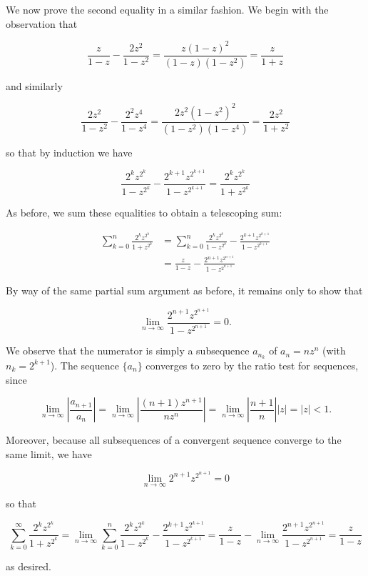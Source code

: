 \begin{solution}
    \pagebreak

    We now prove the second equality in a similar fashion. We begin with the observation that  

    $$
        \frac{z}{1 - z} - \frac{2 z^2}{1 - z^2} = \frac{z (1 - z)^2}{(1 - z)(1 - z^2)} = \frac{z}{1 + z}
    $$

    and similarly

    $$
        \frac{2 z^2}{1 - z^2} - \frac{2^2 z^4}{1 - z^4} = \frac{2z^2 (1 - z^2)^2}{(1 - z^2)(1 - z^4)} = \frac{2 z^2}{1 + z^2}
    $$

    so that by induction we have

    $$
        \frac{2^k z^{2^k}}{1 - z^{2^k}} - \frac{2^{k+1} z^{2^{k+1}}}{1 - z^{2^{k+1}}} = \frac{2^k z^{2^k}}{1 + z^{2^k}}
    $$

    As before, we sum these equalities to obtain a telescoping sum:

    \begin{align*}
        \sum\limits_{k=0}^{n} \frac{2^k z^{2^k}}{1 + z^{2^k}} &= \sum\limits_{k=0}^{n} \frac{2^k z^{2^k}}{1 - z^{2^k}} - \frac{2^{k+1} z^{2^{k+1}}}{1 - z^{2^{k+1}}} \\
                                                              &= \frac{z}{1 - z} - \frac{2^{n+1} z^{2^{n+1}}}{1 - z^{2^{n+1}}}
    \end{align*}

    By way of the same partial sum argument as before, it remains only to show that

    $$
        \lim\limits_{n \to \infty} \frac{2^{n+1} z^{2^{n+1}}}{1 - z^{2^{n+1}}} = 0.
    $$

    We observe that the numerator is simply a subsequence $a_{n_k}$ of $a_n = n z^n$ (with $n_k = 2^{k+1}$). The 
    sequence $\{ a_n \}$ converges to zero by the ratio test for sequences, since

    $$
    \lim\limits_{n \to \infty} \left| \frac{a_{n+1}}{a_n} \right| = \lim\limits_{n \to \infty} \left| \frac{(n+1) z^{n+1}}{n z^n} \right| = \lim\limits_{n \to \infty} \left| \frac{n+1}{n} \right| |z| = |z| < 1.
    $$

    Moreover, because all subsequences of a convergent sequence converge to the same limit, we have 

    $$
        \lim\limits_{n \to \infty} 2^{n+1} z^{2^{n+1}} = 0
    $$

    so that 

    $$
        \sum\limits_{k=0}^{\infty} \frac{2^k z^{2^k}}{1 + z^{2^k}} = \lim\limits_{n \to \infty} \sum\limits_{k=0}^{n} \frac{2^k z^{2^k}}{1 - z^{2^k}} - \frac{2^{k+1} z^{2^{k+1}}}{1 - z^{2^{k+1}}} 
                                                                   = \frac{z}{1 - z} - \lim\limits_{n \to \infty} \frac{2^{n+1} z^{2^{n+1}}}{1 - z^{2^{n+1}}}
                                                                   = \frac{z}{1 - z}
    $$

    as desired.
    \ \\
\end{solution}